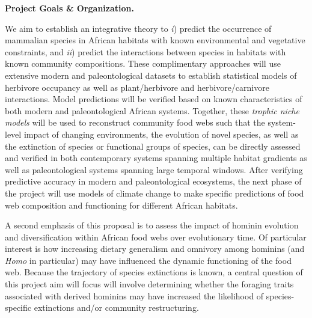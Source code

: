 \documentclass[11pt]{article}
\begin{document}
\noindent \textbf{Project Goals \& Organization.}
%

We aim to establish an integrative theory to \emph{i}) predict the occurrence of mammalian species in African habitats with known environmental and vegetative constraints, and \emph{ii}) predict the interactions between species in habitats with known community compositions.
These complimentary approaches will use extensive modern and paleontological datasets to establish statistical models of herbivore occupancy as well as plant/herbivore and herbivore/carnivore interactions.
Model predictions will be verified based on known characteristics of both modern and paleontological African systems. %
Together, these \emph{trophic niche models} will be used to reconstruct community food webs such that the system-level impact of changing environments, the evolution of novel species, as well as the extinction of species or functional groups of species, can be directly assessed and verified in both contemporary systems spanning multiple habitat gradients as well as paleontological systems spanning large temporal windows.
After verifying predictive accuracy in modern and paleontological ecosystems, the next phase of the project will use models of climate change to make specific predictions of food web composition and functioning for different African habitats.

A second emphasis of this proposal is to assess the impact of hominin evolution and diversification within African food webs over evolutionary time.
Of particular interest is how increasing dietary generalism and omnivory among hominins (and \emph{Homo} in particular) may have influenced the dynamic functioning of the food web.
Because the trajectory of species extinctions is known, a central question of this project aim will focus will involve determining whether the foraging traits associated with derived hominins may have increased the likelihood of species-specific extinctions and/or community restructuring.
\end{document}
